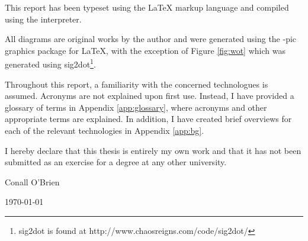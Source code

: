 
This report has been typeset using the \textrm{\LaTeX{}} markup language 
and compiled using the \textrm{\LaTeXe{}} interpreter. 


All diagrams are original works by the author and were generated 
using the \textrm{\Xy-pic{}} graphics package for \textrm{\LaTeX{}},
with the exception of Figure \ref{fig:wot} which was generated using
sig2dot\footnote{sig2dot is found at http://www.chaosreigns.com/code/sig2dot/}.


Throughout this report, a familiarity with the concerned technologues is
assumed. Acronyms are not explained upon first use. Instead, I have 
provided a glossary of terms in Appendix \ref{app:glossary}, where 
acronyms and other appropriate terms are explained. In addition, I have 
created brief overviews for each of the relevant technologies in 
Appendix \ref{app:bg}.



\vfill


I hereby declare that this thesis is entirely my own work and that it
has not been submitted as an exercise for a degree at any other
university.

\vspace{35mm}

\begin{flushright}

\underline{\hspace*{75mm}}

Conall O'Brien

\today

\end{flushright}
